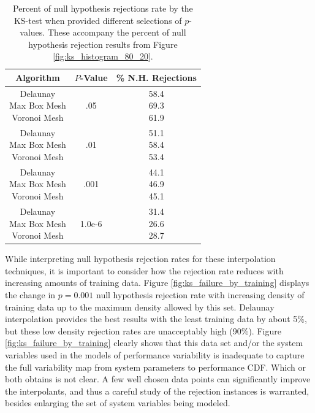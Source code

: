 \begin{table}
  \centering
  \begin{tabular}{c|c|c}
    \hline
    \textbf{Algorithm} & \textbf{$P$-Value} & \textbf{\% N.H. Rejections} \\
    \hline
    \multilinecell{Delaunay\\Max Box Mesh\\Voronoi Mesh} & .05 & \multilinecell{58.4\\69.3\\61.9}\\
    \hline
    \multilinecell{Delaunay\\Max Box Mesh\\Voronoi Mesh} & .01 & \multilinecell{51.1\\58.4\\53.4}\\
    \hline
    \multilinecell{Delaunay\\Max Box Mesh\\Voronoi Mesh} & .001 & \multilinecell{44.1\\46.9\\45.1}\\
    \hline
    \multilinecell{Delaunay\\Max Box Mesh\\Voronoi Mesh} & 1.0e-6 & \multilinecell{31.4\\26.6\\28.7}\\
    \hline
  \end{tabular}
  \caption{Percent of null hypothesis rejections rate by the KS-test when provided different selections of $p$-values. These accompany the percent of null hypothesis rejection results from Figure \ref{fig:ks_histogram_80_20}.}
  \label{tab:p_value_failure_rate}
\end{table}


While interpreting null hypothesis rejection rates for these interpolation techniques, it is important to consider how the rejection rate reduces with increasing amounts of training data. Figure \ref{fig:ks_failure_by_training} displays the change in $p=0.001$ null hypothesis rejection rate with increasing density of training data up to the maximum density allowed by this set. Delaunay interpolation provides the best results with the least training data by about 5\%, but these low density rejection rates are unacceptably high (90\%). Figure \ref{fig:ks_failure_by_training} clearly shows that this data set and/or the system variables used in the models of performance variability is inadequate to capture the full variability map from system parameters to performance CDF. Which or both obtains is not clear. A few well chosen data points can significantly improve the interpolants, and thus a careful study of the rejection instances is warranted, besides enlarging the set of system variables being modeled.


